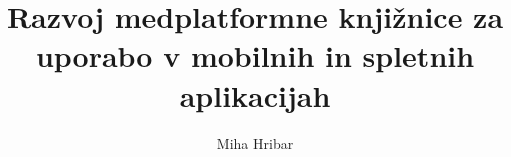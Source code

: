 \documentclass[slovene,BUNRI,twoside]{FRIthesis}
\title[LaTeX predloga][LaTeX thesis class]
      {Razvoj medplatformne knjižnice za uporabo v mobilnih in spletnih aplikacijah}{Developing a cross platform library for use in mobile and web applications}
\author{Miha Hribar}{63010042}
\begin{document}
\maketitle
\makecopyright
\thesistopic
\makedeclaration

\frontmatter
 
 
 \tableofcontents

\mainmatter
 
 
 
 
\end{document}
